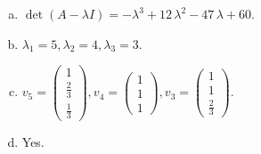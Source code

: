 \begin{questions}
\begin{solution}
\begin{enumerate}[(a)]
\item $\det(A-\lambda I)=-{\lambda}^{3} + 12 \, {\lambda}^{2} - 47 \, {\lambda} + 60$.
\item ${\lambda}_1=5, {\lambda}_2=4, {\lambda}_3=3$.
\item $v_{5}=\left(\begin{array}{r}
1 \\
\frac{2}{3} \\
\frac{1}{3}
\end{array}\right), v_{4}=\left(\begin{array}{r}
1 \\
1 \\
1
\end{array}\right), v_{3}=\left(\begin{array}{r}
1 \\
1 \\
\frac{2}{3}
\end{array}\right)$.
\item Yes.
\end{enumerate}
\end{solution}

\end{questions}

\newpage


\begin{center}
\end{center}

